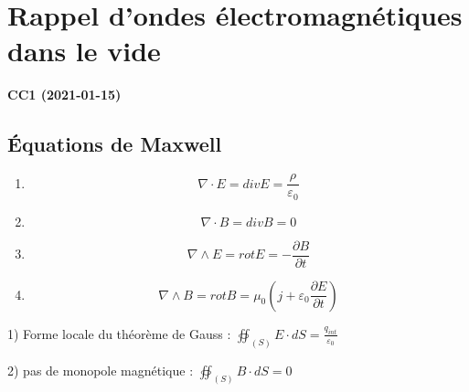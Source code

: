 \documentclass[12pt,a4paper]{report}
\author{Malo Kerebel}
\begin{document}
\begin{titlepage}

\end{titlepage}

\tableofcontents

\chapter{Rappel d'ondes électromagnétiques dans le vide}

\begin{center}
\textbf{CC1 (2021-01-15)}
\end{center}

\section{Équations de Maxwell}

\begin{enumerate}
	\item \[
		\nabla \cdot E = div E = \dfrac{\rho}{\varepsilon_0}
	\]
	\item \[
		\nabla \cdot B = div B = 0
	\]
	\item \[
		\nabla \wedge E = rot E = -\dfrac{\partial B}{\partial t}
	\]
	\item \[
		\nabla \wedge B = rot B = \mu_0 \left( j + \varepsilon_0 \dfrac{\partial E}{\partial t} \right)
	\]
\end{enumerate}

1) Forme locale du théorème de Gauss : \( \oiint_{(S)} E \cdot dS = \frac{q_{int}}{\varepsilon_0}\)

2) pas de monopole magnétique : \( \oiint_{(S)} B \cdot dS = 0\)
\end{document}
